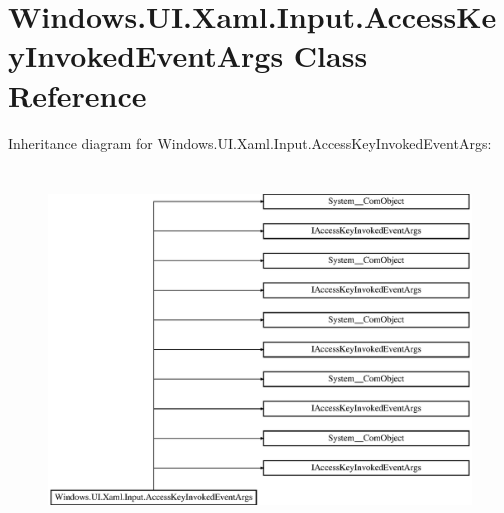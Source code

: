 \hypertarget{class_windows_1_1_u_i_1_1_xaml_1_1_input_1_1_access_key_invoked_event_args}{}\section{Windows.\+U\+I.\+Xaml.\+Input.\+Access\+Key\+Invoked\+Event\+Args Class Reference}
\label{class_windows_1_1_u_i_1_1_xaml_1_1_input_1_1_access_key_invoked_event_args}
Inheritance diagram for Windows.\+U\+I.\+Xaml.\+Input.\+Access\+Key\+Invoked\+Event\+Args\+:\begin{figure}[H]
\begin{center}
\leavevmode
\includegraphics[height=9.655172cm]{class_windows_1_1_u_i_1_1_xaml_1_1_input_1_1_access_key_invoked_event_args}
\end{center}
\end{figure}
